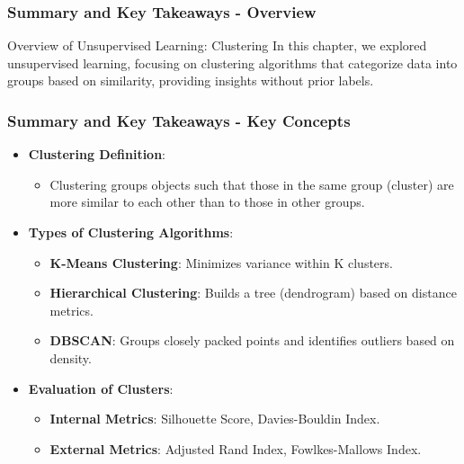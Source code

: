 \documentclass[aspectratio=169]{beamer}
\begin{document}
\begin{frame}[fragile]
    \frametitle{Summary and Key Takeaways - Overview}
    \begin{block}{Overview of Unsupervised Learning: Clustering}
        In this chapter, we explored unsupervised learning, focusing on clustering algorithms that categorize data into groups based on similarity, providing insights without prior labels.
    \end{block}
\end{frame}

\begin{frame}[fragile]
    \frametitle{Summary and Key Takeaways - Key Concepts}
    \begin{itemize}
        \item \textbf{Clustering Definition}:
        \begin{itemize}
            \item Clustering groups objects such that those in the same group (cluster) are more similar to each other than to those in other groups.
        \end{itemize}
        
        \item \textbf{Types of Clustering Algorithms}:
        \begin{itemize}
            \item \textbf{K-Means Clustering}: Minimizes variance within K clusters.
            \item \textbf{Hierarchical Clustering}: Builds a tree (dendrogram) based on distance metrics.
            \item \textbf{DBSCAN}: Groups closely packed points and identifies outliers based on density.
        \end{itemize}
        
        \item \textbf{Evaluation of Clusters}:
        \begin{itemize}
            \item \textbf{Internal Metrics}: Silhouette Score, Davies-Bouldin Index.
            \item \textbf{External Metrics}: Adjusted Rand Index, Fowlkes-Mallows Index.
        \end{itemize}
    \end{itemize}
\end{frame}
\end{document}
